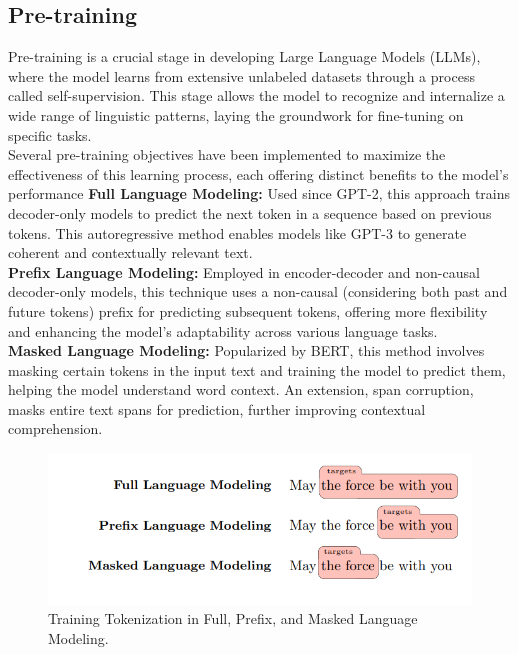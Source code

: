 \subsection{Pre-training}
Pre-training is a crucial stage in developing Large Language Models (LLMs), where the model learns from extensive unlabeled datasets through a process called self-supervision. This stage allows the model to recognize and internalize a wide range of linguistic patterns, laying the groundwork for fine-tuning on specific tasks.\\
Several pre-training objectives have been implemented to maximize the effectiveness of this learning process, each offering distinct benefits to the model's performance
\textbf{Full Language Modeling:} Used since GPT-2, this approach trains decoder-only models to predict the next token in a sequence based on previous tokens. This autoregressive method enables models like GPT-3 to generate coherent and contextually relevant text.\\
\textbf{Prefix Language Modeling: }Employed in encoder-decoder and non-causal decoder-only models, this technique uses a non-causal (considering both past and future tokens) prefix for predicting subsequent tokens, offering more flexibility and enhancing the model's adaptability across various language tasks.\\
\textbf{Masked Language Modeling: }Popularized by BERT, this method involves masking certain tokens in the input text and training the model to predict them, helping the model understand word context. An extension, span corruption, masks entire text spans for prediction, further improving contextual comprehension\cite{wang2023language}.
\begin{figure}[htbp]
	
	\includegraphics[width=1\linewidth]{Figures/pretraining.png}
	\caption{Training Tokenization in Full, Prefix, and Masked Language Modeling.}
\end{figure}
